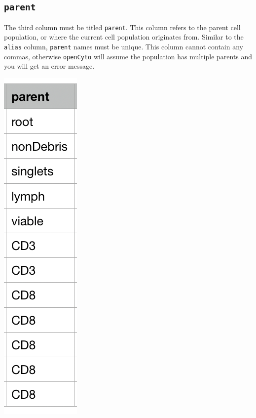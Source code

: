 \documentclass[]{book}
\begin{document}
\hypertarget{parent}{%
\subsection{\texorpdfstring{\texttt{parent}}{parent}}\label{parent}}

The third column must be titled \texttt{parent}. This column refers to the parent cell population, or where the current cell population originates from. Similar to the \texttt{alias} column, \texttt{parent} names must be unique. This column cannot contain any commas, otherwise \texttt{openCyto} will assume the population has multiple parents and you will get an error message.

\includegraphics[width=0.6\linewidth]{./tutorial/images/parent}
\end{document}
